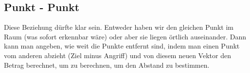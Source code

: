 \subsection{Punkt - Punkt}
	Diese Beziehung dürfte klar sein. Entweder haben wir den gleichen Punkt im Raum
	(was sofort erkennbar wäre) oder aber sie liegen örtlich auseinander. Dann kann
	man angeben, wie weit die Punkte entfernt sind, indem man einen Punkt vom
	anderen abzieht (Ziel minus Angriff) und von diesem neuen Vektor den Betrag
	berechnet, um zu berechnen, um den Abstand zu bestimmen.
